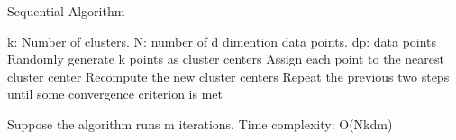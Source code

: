 \documentclass[
nopagebreaks,
style=klope,
fleqn]{powerdot}
\begin{document}
\begin{slide} {Sequential Algorithm}
  \begin{algorithmic}[1]
    \INPUT k: Number of clusters. N: number of d dimention data points. dp: data points 
    \State Randomly generate k points as cluster centers
    \State Assign each point to the nearest cluster center
    \State Recompute the new cluster centers
    \State Repeat the previous two steps until some convergence criterion
    is met
    \EndFunction
  \end{algorithmic}
  \begin{compactitem}
    \item{Suppose the algorithm runs m iterations. Time complexity: O(Nkdm)}
  \end{compactitem}
\end{slide}
\end{document}
